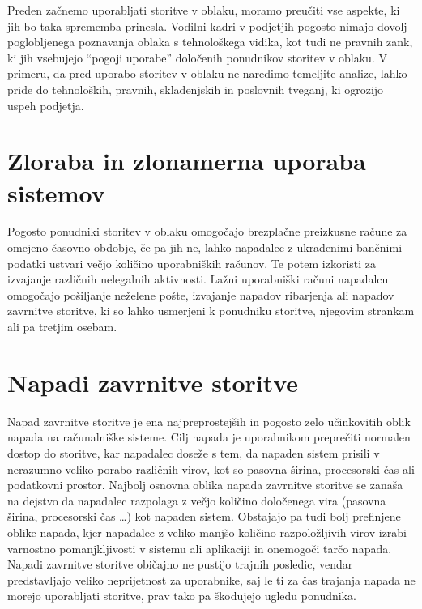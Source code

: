 \documentclass[12pt,a4paper,openany,tikz]{book}
\theoremstyle{plain}
\theoremstyle{definition}
\begin{document}
Preden začnemo uporabljati storitve v oblaku, moramo preučiti vse aspekte, ki jih bo taka sprememba prinesla. Vodilni kadri v podjetjih pogosto nimajo dovolj poglobljenega poznavanja oblaka s tehnološkega vidika, kot tudi ne pravnih zank, ki jih vsebujejo ``pogoji uporabe'' določenih ponudnikov storitev v oblaku. V primeru, da pred uporabo storitev v oblaku ne naredimo temeljite analize, lahko pride do tehnoloških, pravnih, skladenjskih in poslovnih tveganj, ki ogrozijo uspeh podjetja.

\section{Zloraba in zlonamerna uporaba sistemov}
\label{sub:Zloraba in zlonamerna uporaba sistemov}

Pogosto ponudniki storitev v oblaku omogočajo brezplačne preizkusne račune za omejeno časovno obdobje, če pa jih ne, lahko napadalec z ukradenimi bančnimi podatki ustvari večjo količino uporabniških računov. Te potem izkoristi za izvajanje različnih nelegalnih aktivnosti. Lažni uporabniški računi napadalcu omogočajo pošiljanje neželene pošte, izvajanje napadov ribarjenja ali napadov zavrnitve storitve, ki so lahko usmerjeni k ponudniku storitve, njegovim strankam ali pa tretjim osebam.

\section{Napadi zavrnitve storitve}
\label{subs:Napadi zavrnitve storitve}

Napad zavrnitve storitve je ena najpreprostejših in pogosto zelo učinkovitih oblik napada na računalniške sisteme. Cilj napada je uporabnikom preprečiti normalen dostop do storitve, kar napadalec doseže s tem, da napaden sistem prisili v nerazumno veliko porabo različnih virov, kot so pasovna širina, procesorski čas ali podatkovni prostor. Najbolj osnovna oblika napada zavrnitve storitve se zanaša na dejstvo da napadalec razpolaga z večjo količino določenega vira (pasovna širina, procesorski čas …) kot napaden sistem. Obstajajo pa tudi bolj prefinjene oblike napada, kjer napadalec z veliko manjšo količino razpoložljivih virov izrabi varnostno pomanjkljivosti v sistemu ali aplikaciji in onemogoči tarčo napada. Napadi zavrnitve storitve običajno ne pustijo trajnih posledic, vendar predstavljajo veliko neprijetnost za uporabnike, saj le ti za čas trajanja napada ne morejo uporabljati storitve, prav tako pa škodujejo ugledu ponudnika.
\end{document}
